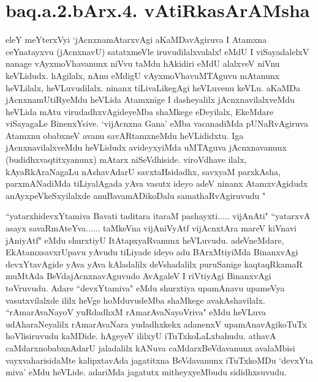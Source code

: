 \section*{baq.a.2.bArx.4. vAtiRkasArAMsha}


\begin{center}
\end{center}


\begin{artha}
eleY meYterxVyi `jAcnxnamAtarxvAgi aKaMDavAgiruva I Atamxna ceYnatayxvu 
(jAcnxnavU) satatxmeVle iruvudilalxvalalx! eMdU I viSayadalelxV nanage 
vAyxmoVhavanunx niVvu taMdu hAkidiri eMdU alalxveV niVnu keVLidudx. hAgilalx, 
nAnu eMdigU vAyxmoVhavuMTAguvu mAtanunx heVLilalx, heVLuvudilalx. ninanx 
tiLivaLikegAgi heVLuvenu keVLu. aKaMDa jAcnxnamUtiRyeMdu heVLida Atamxnige I 
dasheyalilx jAcnxnavilalxveMdu heVLida mAtu virudadhxvAgideyeMba shaMkege 
eDeyilalx, EkeMdare viSayagaLe BinenxYsive. `vijAcnxna Gana' eMba vacanadiMda 
pUNaRvAgiruva Atamxnu obabxneV avanu savARtamxneMdu heVLididxtu. Iga 
jAcnxnavilalxveMdu heVLidudx avideyxyiMda uMTAguva jAcnxnavanunx 
(budidhxvaqtitxyanunx) mAtarx niSeVdhiside. viroVdhave ilalx, kAyaRkAraNagaLu 
nAshavAdarU savxtaHsidadhx, savxyaM parxkAsha, parxmANadiMda tiLiyalAgada yAva 
vasutx ideyo adeV ninanx AtamxvAgidudx anAyxpeVkeSxyilalxde anuBavamADikoDalu 
samathaRvAgiruvudu "
\end{artha}

\begin{artha}
``yatarxhidevxYtamiva Bavati taditara itaraM pashayxti..... vijAnAti"  ``yatarxvA asayx savaRmAteYva...... taMkeVna vijAniVyAtf vijAcnxtAra mareV kiVnavi jAniyAtf" eMdu shurxtiyU ItAtapxyaRvanunx heVLuvudu. adeVneMdare, 
EkAtamxsavxrUpavu yAvudu tiLiyade ideyo adu BArxMtiyiMda BinanxvAgi  
devxYtavAgide  yAva yAva kAladalilx deVshadalilx puruSanige kaqtaqRkamaR muMtAda 
BeVdajAcnxnavAguvudo AvAgaleV I riVtiyAgi BinanxvAgi toVruvudu. Adare 
``devxYtamiva" eMdu shurxtiya upamAnavu upameVya vasutxvilalxde ililx heVge 
hoMduvudeMba shaMkege avakAshavilalx. ``rAmarAvaNayoV yuRdadhxM rAmarAvaNayoVriva" eMdu heVLuva udAharaNeyalilx 
rAmarAvaNara yudadhxkekx adanenxV upamAnavAgikoTuTx hoVlisiruvudu kaMDide. 
hAgeyeV ililxyU iTuTxkoLaLxbahudu. athavA caMdarxnobabxnAdarU jaladalilx kANuva 
caMdarxBeVdavanunx avalaMbisi vayxvaharisidaMte kalipxtavAda jagatitxna 
BeVdavanunx iTuTxkoMDu `devxYta miva' eMdu heVLide. adariMda jagatutx 
mitheyxyeMbudu sididhxsuvudu. 
\end{artha}

